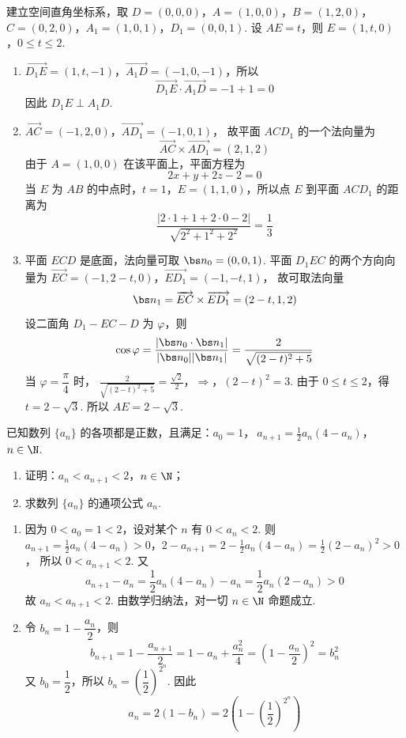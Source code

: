 \begin{solution}
建立空间直角坐标系，取 \(D=(0,0,0)\)，\(A=(1,0,0)\)，\(B=(1,2,0)\)，\(C=(0,2,0)\)，\(A_{1}=(1,0,1)\)，\(D_{1}=(0,0,1)\). 设 \(AE=t\)，则
\(E=(1,t,0)\)，\(0\leqslant t\leqslant2\).

\begin{enumerate}
\item \(\overrightarrow{D_{1}E}=(1,t,-1)\)，\(\overrightarrow{A_{1}D}=(-1,0,-1)\)，所以
\[
\overrightarrow{D_{1}E}\cdot\overrightarrow{A_{1}D}=-1+1=0
\]
因此 \(D_{1}E\perp A_{1}D\).

\item
\(\overrightarrow{AC}=(-1,2,0)\)，\(\overrightarrow{AD_{1}}=(-1,0,1)\)，
故平面 \(ACD_{1}\) 的一个法向量为
\[
\overrightarrow{AC}\times\overrightarrow{AD_{1}}=(2,1,2)
\]
由于 \(A=(1,0,0)\) 在该平面上，平面方程为
\[
2x+y+2z-2=0
\]
当 \(E\) 为 \(AB\) 的中点时，\(t=1\)，\(E=(1,1,0)\)，所以点 \(E\) 到平面 \(ACD_{1}\) 的距离为
\[
\frac{|2\cdot1+1+2\cdot0-2|}{\sqrt{2^{2}+1^{2}+2^{2}}}=\frac13
\]

\item 平面 \(ECD\) 是底面，法向量可取 \(\bs n_0=(0,0,1)\). 平面 \(D_{1}EC\) 的两个方向向量为
\(\overrightarrow{EC}=(-1,2-t,0)\)，\(\overrightarrow{ED_{1}}=(-1,-t,1)\)，
故可取法向量
\[
\bs n_1=\overrightarrow{EC}\times\overrightarrow{ED_{1}}=(2-t,1,2)
\]
设二面角 \(D_{1}-EC-D\) 为 \(\varphi\)，则
\[
\cos\varphi=\frac{|\bs n_0\cdot\bs n_1|}{|\bs n_0||\bs n_1|}
=\frac{2}{\sqrt{(2-t)^2+5}}
\]
当 \(\varphi=\dfrac{\pi}{4}\) 时，
\(\frac{2}{\sqrt{(2-t)^2+5}}=\frac{\sqrt2}{2}\)，\(\Longrightarrow\)，\((2-t)^2=3\).
由于 \(0\leqslant t\leqslant2\)，得 \(t=2-\sqrt3\). 所以 \(AE=2-\sqrt3\).
\end{enumerate}
\end{solution}

\begin{problem}
已知数列 \(\{a_n\}\) 的各项都是正数，且满足：\(a_{0}=1\)，\(\ a_{n+1}=\frac{1}{2}a_n(4-a_n)\)，\(n\in\N\).

\begin{enumerate}
\item 证明：\(a_n<a_{n+1}<2\)，\(n\in\N\)；
\item 求数列 \(\{a_n\}\) 的通项公式 \(a_n\).
\end{enumerate}
\end{problem}

\begin{solution}
\begin{enumerate}
\item 因为 \(0<a_0=1<2\)，设对某个 \(n\) 有 \(0<a_n<2\). 则
\(a_{n+1}=\frac12a_n(4-a_n)>0\)，\(2-a_{n+1}=2-\frac12a_n(4-a_n)=\frac12(2-a_n)^2>0\)，
所以 \(0<a_{n+1}<2\). 又
\[
a_{n+1}-a_n=\frac12a_n(4-a_n)-a_n=\frac12a_n(2-a_n)>0
\]
故 \(a_n<a_{n+1}<2\). 由数学归纳法，对一切 \(n\in\N\) 命题成立.

\item 令 \(b_n=1-\dfrac{a_n}{2}\)，则
\[
b_{n+1}=1-\frac{a_{n+1}}2=1-a_n+\frac{a_n^2}{4}=\left(1-\frac{a_n}{2}\right)^2=b_n^2
\]
又 \(b_0=\dfrac12\)，所以 \(b_n=\left(\dfrac12\right)^{2^n}\). 因此
\[
a_n=2(1-b_n)=2\left(1-\left(\frac12\right)^{2^n}\right)
\]
\end{enumerate}
\end{solution}

